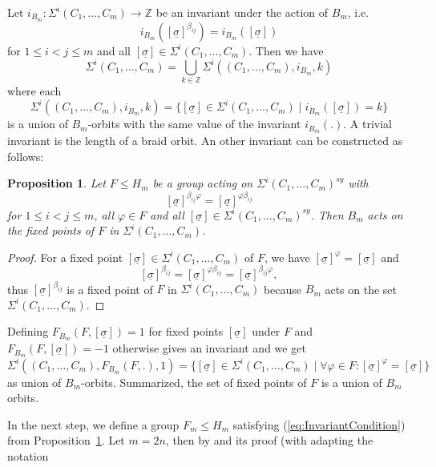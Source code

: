 \documentclass[12pt,a4paper]{article}
\newtheorem{proposition}{Proposition}[section]
\numberwithin{equation}{section}
\numberwithin{table}{section}
\begin{document}
Let $i_{B_m}: \Sigma^i(C_1,\dots, C_m) \rightarrow \mathbb{Z}$ be an invariant under the action of $B_m$, i.e.
$$i_{B_m}([\underline{\sigma}]^{\beta_{ij}}) = i_{B_m}([\underline{\sigma}])$$
for $1 \leq i < j \leq m$ and all $[\underline{\sigma}] \in \Sigma^i(C_1,\dots, C_m)$.
Then we have
$$\Sigma^i(C_1,\dots, C_m) = \bigcup_{k \in \mathbb{Z}} \Sigma^i((C_1,\dots, C_m),i_{B_m},k)$$
where each 
$$\Sigma^i((C_1,\dots, C_m),i_{B_m},k) = 
\{ [\underline{\sigma}] \in \Sigma^i(C_1,\dots, C_m) \mid i_{B_m}([\underline{\sigma}]) = k \}$$
is a union of $B_m$-orbits with the same value of the invariant $i_{B_m}(.)$. A trivial invariant is the length of a braid orbit.
An other invariant can be constructed as follows:
%
\begin{proposition}
\label{BmActionOnFixedPointsF}
Let $F \leq H_m$ be a group acting on $\Sigma^i(C_1,\dots, C_m)^{sy}$ with
\begin{equation} 
\label{eq:InvariantCondition}
[\underline{\sigma}]^{\beta_{ij} \varphi} = [\underline{\sigma}]^{\varphi \beta_{ij}}
\end{equation}
for $1 \leq i < j \leq m$, all $\varphi \in F$ and all $[\underline{\sigma}] \in \Sigma^i(C_1,\dots, C_m)^{sy}$.
Then $B_m$ acts on the fixed points of $F$ in $\Sigma^i(C_1,\dots, C_m)$.
\end{proposition}
\begin{proof}
For a fixed point $[\underline{\sigma}] \in \Sigma^i(C_1,\dots, C_m)$ of $F$, we have
$[\underline{\sigma}]^{\varphi} = [\underline{\sigma}]$ and
$$[\underline{\sigma}]^{\beta_{ij}} = [\underline{\sigma}]^{\varphi \beta_{ij}} = [\underline{\sigma}]^{\beta_{ij} \varphi},$$
thus $[\underline{\sigma}]^{\beta_{ij}}$ is a fixed point of $F$ in $\Sigma^i(C_1,\dots, C_m)$ because
$B_m$ acts on the set $\Sigma^i(C_1,\dots, C_m)$.
\end{proof}
%
\noindent
Defining $F_{B_m}(F,[\underline{\sigma}])=1$ for fixed points $[\underline{\sigma}]$ under $F$
and $F_{B_m}(F,[\underline{\sigma}])=-1$ otherwise gives an invariant and we get
$$
\Sigma^i((C_1,\dots, C_m),F_{B_m}(F, .), 1) = 
\{ [\underline{\sigma}] \in \Sigma^i(C_1,\dots, C_m) \mid \forall \varphi \in F: [\underline{\sigma}]^{\varphi} = [\underline{\sigma}] \}
$$
as union of $B_m$-orbits. Summarized, the set of fixed points of $F$ is a union of $B_m$ orbits.
\par
\noindent
In the next step, we define a group $F_m \leq H_m$ satisfying (\ref{eq:InvariantCondition}) from Proposition~\ref{BmActionOnFixedPointsF}.
Let $m=2n$, then by \cite[Theorem (ii)]{RefGon2007} and its proof (with adapting the notation 
\end{document}
